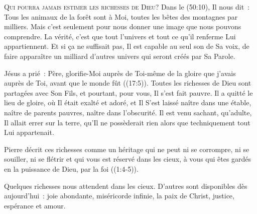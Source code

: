 
\lettrine{Q}{ui pourra jamais estimer les richesses de Dieu?}
 Dans le (50:10), Il nous dit~: 
 \og Tous les animaux de la forêt sont à Moi,
 toutes les bêtes des montagnes par milliers. \fg{}
 Mais c'est seulement pour nous donner une image que nous pouvons comprendre.
 La vérité, c'est que tout l'univers et tout ce qu'il renferme
 Lui appartiennent. Et si ça ne suffisait pas, Il est capable au seul son
 de Sa voix, de faire apparaître un milliard d'autres univers
 qui seront créés par Sa Parole.

Jésus a prié~: 
 \og Père, glorifie-Moi auprès de Toi-même de la gloire
 que j'avais auprès de Toi, avant que le monde fût \fg{}
 ((17:5)).
 Toutes les richesses de Dieu sont partagées avec Son Fils, et pourtant,
 pour vous, Il s'est fait pauvre. Il a quitté le lieu de gloire,
 où Il était exalté et adoré, et Il S'est laissé naître dans une étable,
 naître de parents pauvres, naître dans l'obscurité.
 Il est venu sachant, qu'adulte, Il allait errer sur la terre,
 qu'Il ne possèderait rien alors que techniquement tout Lui appartenait.


Pierre décrit ces richesses comme \og un héritage qui ne peut ni se corrompre,
 ni se souiller, ni se flétrir et qui vous est réservé dans les cieux,
 à vous qui êtes gardés en la puissance de Dieu, par la foi \fg{}
 ((1:4-5)). 

Quelques richesses nous attendent dans les cieux.
 D'autres sont disponibles dès aujourd'hui~:
 joie abondante, miséricorde infinie, la paix de Christ,
 justice, espérance et amour.

\dvrule






